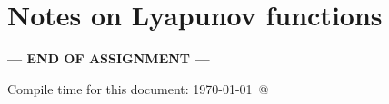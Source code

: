 \documentclass[12pt]{article}
\begin{document}
\newpage
\hypertarget{NotesLyapFuns}{}
\section*{Notes on Lyapunov functions}

\NotesOnLyapunovFunctions




\bigskip

\centerline{\bf--- END OF ASSIGNMENT ---}

\bigskip
Compile time for this document:
\today\ @ \thistime
\end{document}
